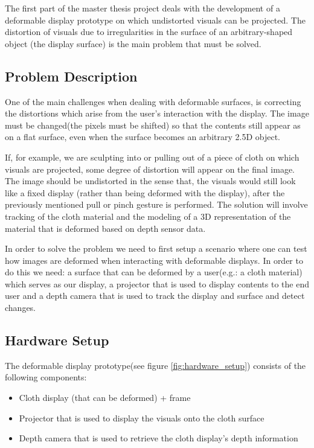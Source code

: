 \documentclass[]{article}
\begin{document}
The first part of the master thesis project deals with the development of a deformable display prototype on which undistorted visuals can be projected. The distortion of visuals due to irregularities in the surface of an arbitrary-shaped object (the display surface) is the main problem that must be solved. 

\subsection{Problem Description}

One of the main challenges when dealing with deformable surfaces, is correcting the distortions which arise from the user's interaction with the display. The image must be changed(the pixels must be shifted) so that the contents still appear as on a flat surface, even when the surface becomes an arbitrary 2.5D object.

If, for example, we are sculpting into or pulling out of a piece of cloth on which visuals are projected, some degree of distortion will appear on the final image. 
The image should be undistorted in the sense that, the visuals would still look like a fixed display (rather than being deformed with the display), after the previously mentioned pull or pinch gesture is performed. The solution will involve tracking of the cloth material and the modeling of a 3D representation of the material that is deformed based on depth sensor data.

In order to solve the problem we need to first setup a scenario where one can test how images are deformed when interacting with deformable displays. In order to do this we need: a surface that can be deformed by a user(e.g.: a cloth material) which serves as our display, a projector that is used to display contents to the end user and a depth camera that is used to track the display and surface and detect changes.

\subsection{Hardware Setup}

The deformable display prototype(see figure \ref{fig:hardware_setup}) consists of the following components:
\begin{itemize}
\item Cloth display (that can be deformed) + frame
\item Projector that is used to display the visuals onto the cloth surface
\item Depth camera that is used to retrieve the cloth display’s depth information
\end{itemize}
\end{document}

